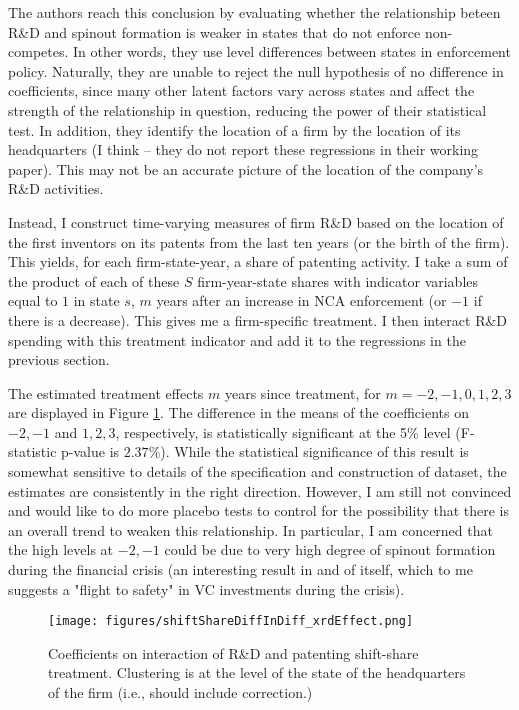 \documentclass[11pt,english]{article}
\theoremstyle{remark}
\begin{document}
The authors reach this conclusion by evaluating whether the relationship beteen R\&D and spinout formation is weaker in states that do not enforce non-competes. In other words, they use level differences between states in enforcement policy. Naturally, they are unable to reject the null hypothesis of no difference in coefficients, since many other latent factors vary across states and affect the strength of the relationship in question, reducing the power of their statistical test. In addition, they identify the location of a firm by the location of its headquarters (I think -- they do not report these regressions in their working paper). This may not be an accurate picture of the location of the company's R\&D activities.

Instead, I construct time-varying measures of firm R\&D based on the location of the first inventors on its patents from the last ten years (or the birth of the firm). This yields, for each firm-state-year, a share of patenting activity. I take a sum of the product of each of these $S$ firm-year-state shares with indicator variables equal to $1$ in state $s$, $m$ years after an increase in NCA enforcement (or $-1$ if there is a decrease). This gives me a firm-specific treatment. I then interact R\&D spending with this treatment indicator and add it to the regressions in the previous section.

The estimated treatment effects $m$ years since treatment, for $m = -2,-1,0,1,2,3$ are displayed in Figure \ref{shiftShare_xrdEffect_results}. The difference in the means of the coefficients on $-2,-1$ and $1,2,3$, respectively, is statistically significant at the 5\% level (F-statistic p-value is $2.37\%$). While the statistical significance of this result is somewhat sensitive to details of the specification and construction of dataset, the estimates are consistently in the right direction. However, I am still not convinced and would like to do more placebo tests to control for the possibility that there is an overall trend to weaken this relationship. In particular, I am concerned that the high levels at $-2,-1$ could be due to very high degree of spinout formation during the financial crisis (an interesting result in and of itself, which to me suggests a "flight to safety" in VC investments during the crisis). 


\begin{figure}
	\centering
	\texttt{[image: figures/shiftShareDiffInDiff\_xrdEffect.png]}
	\caption{Coefficients on interaction of R\&D and patenting shift-share treatment. Clustering is at the level of the state of the headquarters of the firm (i.e., should include \cite{adao_shift-share_2019} correction.)}
	\label{shiftShare_xrdEffect_results}
\end{figure}
\end{document}
